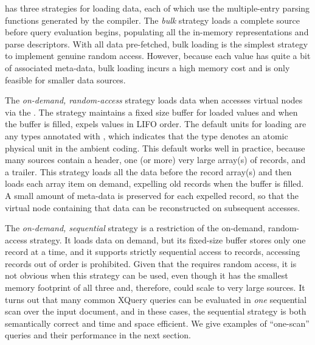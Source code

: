 \padx{} has three strategies for loading data, each of which use the
multiple-entry parsing functions generated by the \pads{} compiler.
The \emph{bulk} strategy loads a complete \pads{} source before query
evaluation begins, populating all the in-memory representations and
parse descriptors.  With all data pre-fetched, bulk loading is the
simplest strategy to implement genuine random access.  However,
because each \pads{} value has quite a bit of associated meta-data, bulk
loading incurs a high memory cost and is only feasible for smaller
data sources.

The \emph{on-demand, random-access} strategy loads \pads{} data when
\Galax{} accesses virtual nodes via the \absdm{}.  The strategy
maintains a fixed size buffer for loaded values and when the buffer is
filled, expels values in LIFO order.  The default units for loading
are any \pads{} types annotated with , which indicates
that the type denotes an atomic physical unit in the ambient coding.
This default works well in practice, because many \pads{} sources
contain a header, one (or more) very large array(s) of records, and a
trailer.  This strategy loads all the data before the record array(s)
and then loads each array item on demand, expelling old records when
the buffer is filled.  A small amount of meta-data is preserved for
each expelled record, so that the virtual node containing that data
can be reconstructed on subsequent accesses.

The \emph{on-demand, sequential} strategy is a restriction of the
on-demand, random-access strategy.  It loads data on demand, but its
fixed-size buffer stores only one record at a time, and it supports
strictly sequential access to records, \ie{} accessing records out of
order is prohibited.  Given that the \Galax{} \absdm{} requires random
access, it is not obvious when this strategy can be used, even though
it has the smallest memory footprint of all three and, therefore,
could scale to very large sources.  It turns out that many common
XQuery queries can be evaluated in \emph{one} sequential scan over the
input document, and in these cases, the sequential strategy is both
semantically correct and time and space efficient.  We give
examples of ``one-scan'' queries and their performance in the next
section.


